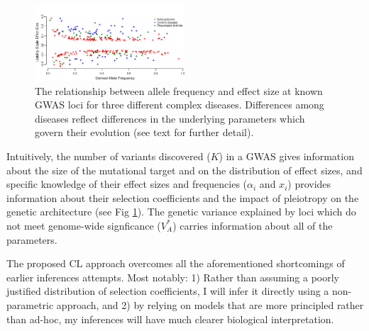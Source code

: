 \message{ !name(ResearchStrategy.tex)}\documentclass[11pt]{article}
\begin{document}
\begin{figure}
\includegraphics[width=0.5\textwidth]{../figures/JointSpecFig.pdf}
\caption{The relationship between allele frequency and effect size at known GWAS loci for three different complex diseases. Differences among diseases reflect differences in the underlying parameters which govern their evolution (see text for further detail).}
\label{joint-freq-effect-dist}
\end{figure}




Intuitively, the number of variants discovered ($K$) in a GWAS gives information about the size of the mutational target and on the distribution of effect sizes, and specific knowledge of their effect sizes and frequencies ($\alpha_i$ and $x_i$) provides information about their selection coefficients and the impact of pleiotropy on the genetic architecture (see Fig \ref{joint-freq-effect-dist}). The genetic variance explained by loci which do not meet genome-wide signficance ($V_A^*$) carries information about all of the parameters.

The proposed CL approach overcomes all the aforementioned shortcomings of earlier inferences attempts.  Most notably: 1) Rather than assuming a poorly justified distribution of selection coefficients, I will infer it directly using a non-parametric approach, and 2) by relying on models that are more principled rather than ad-hoc, my inferences will have much clearer biological interpretation. 
\end{document}
